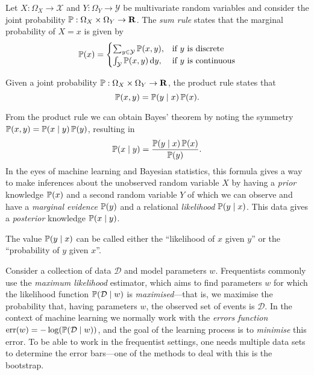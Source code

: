 \begin{lemma}
\label{lem:joint-probability-sum-rule}
Let \(X: \Omega_X \to \mathcal{X}\) and \(Y: \Omega_Y \to \mathcal{Y}\) be
multivariate random variables and consider the joint probability
\(\operatorname{\mathbb{P}}: \Omega_X \times \Omega_Y \to \mathbf{R}\). The \emph{sum rule}
states that the marginal probability of \(X = x\) is given by
\[
\operatorname{\mathbb{P}}(x) =
\begin{cases}
  \sum_{y \in \mathcal{Y}} \operatorname{\mathbb{P}}(x, y), &\text{if } y \text{ is discrete} \\
  \int_{\mathcal{Y}} \operatorname{\mathbb{P}}(x, y)\, \mathrm{d} y, &\text{if } y \text{ is continuous}
\end{cases}
\]
\end{lemma}

\begin{lemma}
\label{lem:joint-probability-product-rule}
Given a joint probability \(\operatorname{\mathbb{P}}: \Omega_X \times \Omega_Y \to \mathbf{R}\), the product
rule states that
\[
\operatorname{\mathbb{P}}(x, y) = \operatorname{\mathbb{P}}(y \mid x) \operatorname{\mathbb{P}}(x).
\]
\end{lemma}

From the product rule we can obtain Bayes' theorem by noting the symmetry
\(\operatorname{\mathbb{P}}(x, y) = \operatorname{\mathbb{P}}(x \mid y) \operatorname{\mathbb{P}}(y)\), resulting in
\[
\operatorname{\mathbb{P}}(x \mid y) = \frac{\operatorname{\mathbb{P}}(y \mid x) \operatorname{\mathbb{P}}(x)}{\operatorname{\mathbb{P}}(y)}.
\]
In the eyes of machine learning and Bayesian statistics, this formula gives a
way to make inferences about the unobserved random variable \(X\) by having a
\emph{prior} knowledge \(\operatorname{\mathbb{P}}(x)\) and a second random variable \(Y\) of which we
can observe and have a \emph{marginal evidence} \(\operatorname{\mathbb{P}}(y)\) and a relational
\emph{likelihood} \(\operatorname{\mathbb{P}}(y \mid x)\). This data gives a \emph{posterior} knowledge
\(\operatorname{\mathbb{P}}(x \mid y)\).

\begin{remark}
\label{rem:likelihood}
The value \(\operatorname{\mathbb{P}}(y \mid x)\) can be called either the ``likelihood of \(x\) given
\(y\)'' or the ``probability of \(y\) given \(x\)''.
\end{remark}

Consider a collection of data \(\mathcal{D}\) and model parameters
\(w\). Frequentists commonly use the \emph{maximum likelihood} estimator, which
aims to find parameters \(w\) for which the likelihood function
\(\operatorname{\mathbb{P}}(\mathcal{D} \mid w)\) is \emph{maximised}---that is, we maximise the
probability that, having parameters \(w\), the observed set of events is
\(\mathcal{D}\). In the context of machine learning we normally work
with the \emph{errors function}
\(\operatorname{err}(w) = -\log(\operatorname{\mathbb{P}}(\mathcal{D} \mid w))\), and the goal of
the learning process is to \emph{minimise} this error. To be able to work in the
frequentist settings, one needs multiple data sets to determine the error
bars---one of the methods to deal with this is the bootstrap.

